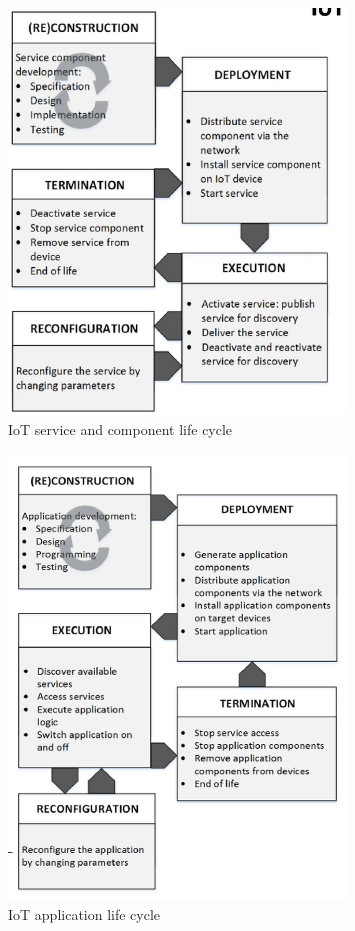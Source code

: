 \documentclass[11pt]{article}
\begin{document}
    \begin{figure}[H]
        \centering
        \includegraphics[width=0.8\textwidth]{img/paste-20201111125632.png}
        \caption{IoT service and component life cycle}
    \end{figure}

    \begin{figure}[H]
        \centering
        \includegraphics[width=0.8\textwidth]{img/paste-20201111125919.png}
        \caption{IoT application life cycle}
    \end{figure}
\end{document}
